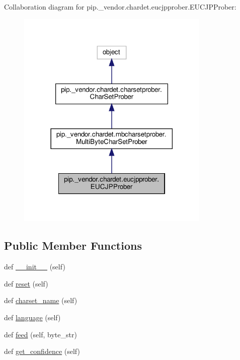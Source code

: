 Collaboration diagram for pip.\+\_\+vendor.\+chardet.\+eucjpprober.\+E\+U\+C\+J\+P\+Prober\+:
\nopagebreak
\begin{figure}[H]
\begin{center}
\leavevmode
\includegraphics[width=261pt]{classpip_1_1__vendor_1_1chardet_1_1eucjpprober_1_1EUCJPProber__coll__graph}
\end{center}
\end{figure}
\subsection*{Public Member Functions}
\begin{DoxyCompactItemize}
\item 
def \hyperlink{classpip_1_1__vendor_1_1chardet_1_1eucjpprober_1_1EUCJPProber_aad9e0c27be728bc74ee4e7a8ae4d5f2a}{\+\_\+\+\_\+init\+\_\+\+\_\+} (self)
\item 
def \hyperlink{classpip_1_1__vendor_1_1chardet_1_1eucjpprober_1_1EUCJPProber_a64b3799fc2f0b29abfa585ff595600d8}{reset} (self)
\item 
def \hyperlink{classpip_1_1__vendor_1_1chardet_1_1eucjpprober_1_1EUCJPProber_a99558210885552a36db513ce251b5237}{charset\+\_\+name} (self)
\item 
def \hyperlink{classpip_1_1__vendor_1_1chardet_1_1eucjpprober_1_1EUCJPProber_aed402fd71c8687729cf8545f2b10102a}{language} (self)
\item 
def \hyperlink{classpip_1_1__vendor_1_1chardet_1_1eucjpprober_1_1EUCJPProber_ad96303aded5d210f4161a85cee288db1}{feed} (self, byte\+\_\+str)
\item 
def \hyperlink{classpip_1_1__vendor_1_1chardet_1_1eucjpprober_1_1EUCJPProber_ab2f36d404a7e220139f59721c224d22d}{get\+\_\+confidence} (self)
\end{DoxyCompactItemize}
